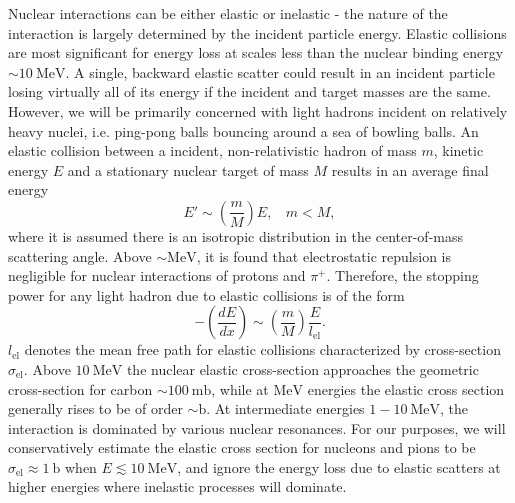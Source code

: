 \documentclass[twocolumn,showpacs,preprintnumbers,amsmath,amssymb,prd]{revtex4}
\newcommand{\MeV}{\text{MeV}}
\def\r{\right)}
\def\l{\left(}
\begin{document}
\begin{appendices}
Nuclear interactions can be either elastic or inelastic - the nature of the interaction is largely determined by the incident particle energy. 
Elastic collisions are most significant for energy loss at scales less than the nuclear binding energy $\sim 10 ~\text{MeV}$.
A single, backward elastic scatter could result in an incident particle losing virtually all of its energy if the incident and target masses are the same.
However, we will be primarily concerned with light hadrons incident on relatively heavy nuclei, i.e. ping-pong balls bouncing around a sea of bowling balls.
An elastic collision between a incident, non-relativistic hadron of mass $m$, kinetic energy $E$ and a stationary nuclear target of mass $M$ results in an average final energy
\begin{equation}
\label{eq:elasticratio}
E' \sim \l \frac{m}{M}\r E, ~~~~ m < M,
\end{equation}
where it is assumed there is an isotropic distribution in the center-of-mass scattering angle.
Above $\sim \text{MeV}$, it is found that electrostatic repulsion is negligible for nuclear interactions of protons and $\pi^+$. 
Therefore, the stopping power for any light hadron due to elastic collisions is of the form
\begin{equation}
- \l \frac{dE}{dx} \r \sim \l \frac{m}{M} \r \frac{E}{l_\text{el}}. 
\end{equation}
$l_\text{el}$ denotes the mean free path for elastic collisions characterized by cross-section $\sigma_\text{el}$. 
Above $10 ~\MeV$ the nuclear elastic cross-section approaches the geometric cross-section for carbon $\sim 100 ~\text{mb}$, while at $\MeV$ energies the elastic cross section generally rises to be of order $\sim \text{b}$. 
At intermediate energies $1 - 10 ~\MeV$, the interaction is dominated by various nuclear resonances. 
For our purposes, we will conservatively estimate the elastic cross section for nucleons and pions to be $\sigma_\text{el} \approx 1 ~\text{b}$ when $E \lesssim 10 ~\MeV$, and ignore the energy loss due to elastic scatters at higher energies where inelastic processes will dominate. 


\end{appendices}
\end{document}
